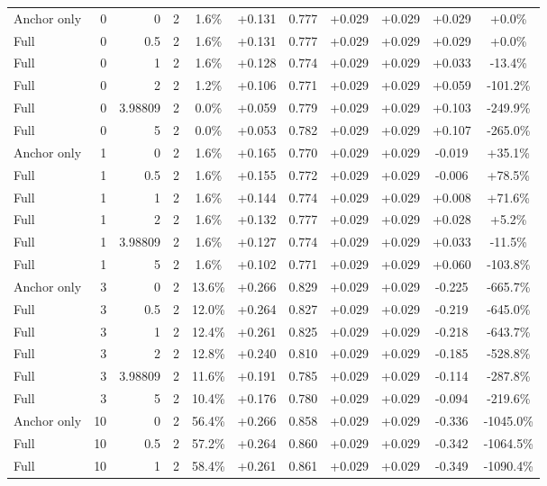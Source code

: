 \begin{table}[htbp]
\begin{tabular}{lrrrccccccc}
Anchor only & 0 & 0 & 2 & 1.6\% & +0.131 & 0.777 & +0.029 & +0.029 & +0.029 & +0.0\% \\
Full & 0 & 0.5 & 2 & 1.6\% & +0.131 & 0.777 & +0.029 & +0.029 & +0.029 & +0.0\% \\
Full & 0 & 1 & 2 & 1.6\% & +0.128 & 0.774 & +0.029 & +0.029 & +0.033 & -13.4\% \\
Full & 0 & 2 & 2 & 1.2\% & +0.106 & 0.771 & +0.029 & +0.029 & +0.059 & -101.2\% \\
Full & 0 & 3.98809 & 2 & 0.0\% & +0.059 & 0.779 & +0.029 & +0.029 & +0.103 & -249.9\% \\
Full & 0 & 5 & 2 & 0.0\% & +0.053 & 0.782 & +0.029 & +0.029 & +0.107 & -265.0\% \\
Anchor only & 1 & 0 & 2 & 1.6\% & +0.165 & 0.770 & +0.029 & +0.029 & -0.019 & +35.1\% \\
Full & 1 & 0.5 & 2 & 1.6\% & +0.155 & 0.772 & +0.029 & +0.029 & -0.006 & +78.5\% \\
Full & 1 & 1 & 2 & 1.6\% & +0.144 & 0.774 & +0.029 & +0.029 & +0.008 & +71.6\% \\
Full & 1 & 2 & 2 & 1.6\% & +0.132 & 0.777 & +0.029 & +0.029 & +0.028 & +5.2\% \\
Full & 1 & 3.98809 & 2 & 1.6\% & +0.127 & 0.774 & +0.029 & +0.029 & +0.033 & -11.5\% \\
Full & 1 & 5 & 2 & 1.6\% & +0.102 & 0.771 & +0.029 & +0.029 & +0.060 & -103.8\% \\
Anchor only & 3 & 0 & 2 & 13.6\% & +0.266 & 0.829 & +0.029 & +0.029 & -0.225 & -665.7\% \\
Full & 3 & 0.5 & 2 & 12.0\% & +0.264 & 0.827 & +0.029 & +0.029 & -0.219 & -645.0\% \\
Full & 3 & 1 & 2 & 12.4\% & +0.261 & 0.825 & +0.029 & +0.029 & -0.218 & -643.7\% \\
Full & 3 & 2 & 2 & 12.8\% & +0.240 & 0.810 & +0.029 & +0.029 & -0.185 & -528.8\% \\
Full & 3 & 3.98809 & 2 & 11.6\% & +0.191 & 0.785 & +0.029 & +0.029 & -0.114 & -287.8\% \\
Full & 3 & 5 & 2 & 10.4\% & +0.176 & 0.780 & +0.029 & +0.029 & -0.094 & -219.6\% \\
Anchor only & 10 & 0 & 2 & 56.4\% & +0.266 & 0.858 & +0.029 & +0.029 & -0.336 & -1045.0\% \\
Full & 10 & 0.5 & 2 & 57.2\% & +0.264 & 0.860 & +0.029 & +0.029 & -0.342 & -1064.5\% \\
Full & 10 & 1 & 2 & 58.4\% & +0.261 & 0.861 & +0.029 & +0.029 & -0.349 & -1090.4\% \\

\end{tabular}
\end{table}
